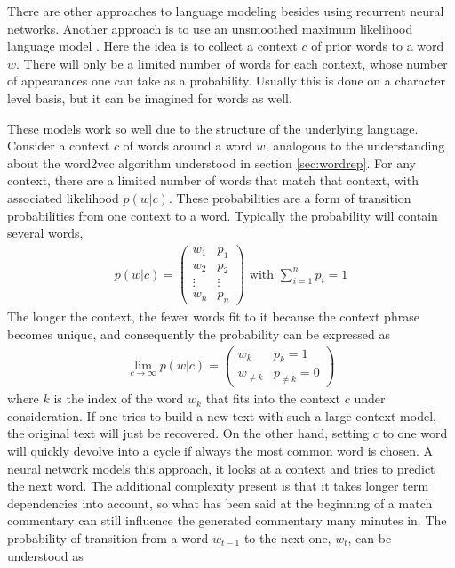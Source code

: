 \documentclass[10pt, a4paper]{UUThesisTemplate}
\begin{document}
There are other approaches to language modeling besides using recurrent neural networks. Another approach is to use an unsmoothed maximum likelihood language model \cite{maxlangmodel}. Here the idea is to collect a context $c$ of prior words to a word $w$. There will only be a limited number of words for each context, whose number of appearances one can take as a probability. Usually this is done on a character level basis, but it can be imagined for words as well.

These models work so well due to the structure of the underlying language. Consider a context $c$ of words around a word $w$, analogous to the understanding about the word2vec algorithm understood in section \ref{sec:wordrep}. For any context, there are a limited number of words that match that context, with associated likelihood $p(w|c)$. These probabilities are a form of transition probabilities from one context to a word. Typically the probability will contain several words,
\begin{align}
p(w|c) = \begin{pmatrix} w_1 & p_1\\ w_2 & p_2\\\vdots & \vdots\\w_n & p_n\end{pmatrix} \text{ with }\sum_{i=1}^n p_i = 1
\end{align}
The longer the context, the fewer words fit to it because the context phrase becomes unique, and consequently the probability can be expressed as
\begin{align}
\lim\limits_{c\to\infty}p(w|c) = \begin{pmatrix} w_k & p_k = 1\\ w_{\ne k} & p_{\ne k} = 0\end{pmatrix}
\end{align}
where $k$ is the index of the word $w_k$ that fits into the context $c$ under consideration. If one tries to build a new text with such a large context model, the original text will just be recovered. On the other hand, setting $c$ to one word will quickly devolve into a cycle if always the most common word is chosen. 
A neural network models this approach, it looks at a context and tries to predict the next word. The additional complexity present is that it takes longer term dependencies into account, so what has been said at the beginning of a match commentary can still influence the generated commentary many minutes in. The probability of transition from a word $w_{t-1}$ to the next one, $w_t$, can be understood as
\end{document}
